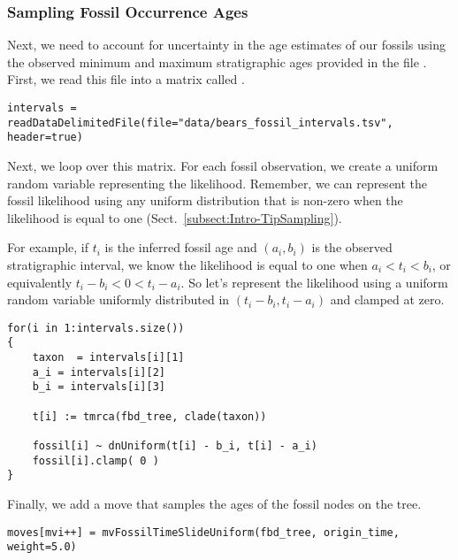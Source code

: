\subsubsection{Sampling Fossil Occurrence Ages}\label{subsub:Exercise-FBD-TipSampling}

Next, we need to account for uncertainty in the age estimates of our fossils using the observed minimum and maximum stratigraphic ages provided in the file .
First, we read this file into a matrix called .

{\tt \begin{snugshade*}
\begin{lstlisting}
intervals = readDataDelimitedFile(file="data/bears_fossil_intervals.tsv", header=true)
\end{lstlisting}
\end{snugshade*}}

Next, we loop over this matrix.
For each fossil observation, we create a uniform random variable representing the likelihood.
Remember, we can represent the fossil likelihood using any uniform distribution that is non-zero when the likelihood is equal to one (Sect.\ \ref{subsect:Intro-TipSampling}).

For example, if $t_i$ is the inferred fossil age and $(a_i,b_i)$ is the observed stratigraphic interval, we know the likelihood is equal to one when $a_i < t_i < b_i$, or equivalently $t_i - b_i < 0 < t_i - a_i$.
So let's represent the likelihood using a uniform random variable uniformly distributed in $(t_i - b_i, t_i - a_i)$ and clamped at zero.


{\tt \begin{snugshade*}
\begin{lstlisting}
for(i in 1:intervals.size())
{
    taxon  = intervals[i][1]
    a_i = intervals[i][2]
    b_i = intervals[i][3]
    
    t[i] := tmrca(fbd_tree, clade(taxon))
        
    fossil[i] ~ dnUniform(t[i] - b_i, t[i] - a_i)
    fossil[i].clamp( 0 )
}
\end{lstlisting}
\end{snugshade*}}


Finally, we add a move that samples the ages of the fossil nodes on the tree. 
{\tt \begin{snugshade*}
\begin{lstlisting}
moves[mvi++] = mvFossilTimeSlideUniform(fbd_tree, origin_time, weight=5.0)
\end{lstlisting}
\end{snugshade*}}

